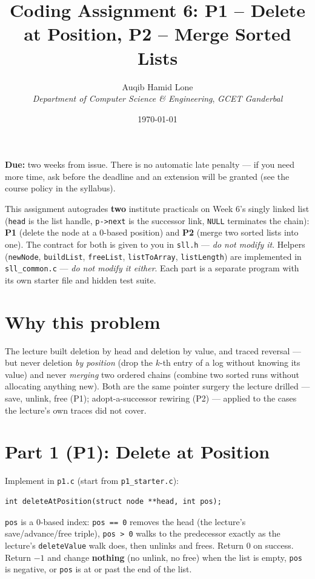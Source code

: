 \documentclass[11pt]{article}
\title{Coding Assignment 6: P1 -- Delete at Position, P2 -- Merge Sorted Lists}
\author{Auqib Hamid Lone\\[0.3em]
  \emph{Department of Computer Science \& Engineering}, \emph{GCET Ganderbal}}
\date{\today}
\begin{document}
\maketitle

\noindent\textbf{Due:} two weeks from issue. There is no automatic late penalty --- if you need more time, ask before the deadline and an extension will be granted (see the course policy in the syllabus).

\noindent This assignment autogrades \textbf{two} institute practicals on Week 6's singly linked list (\texttt{head} is the list handle, \texttt{p->next} is the successor link, \texttt{NULL} terminates the chain): \textbf{P1} (delete the node at a 0-based position) and \textbf{P2} (merge two sorted lists into one). The contract for both is given to you in \texttt{sll.h} --- \emph{do not modify it}. Helpers (\texttt{newNode}, \texttt{buildList}, \texttt{freeList}, \texttt{listToArray}, \texttt{listLength}) are implemented in \texttt{sll\_common.c} --- \emph{do not modify it either}. Each part is a separate program with its own starter file and hidden test suite.

\section{Why this problem}

The lecture built deletion by head and deletion by value, and traced reversal --- but never deletion \emph{by position} (drop the $k$-th entry of a log without knowing its value) and never \emph{merging} two ordered chains (combine two sorted runs without allocating anything new). Both are the same pointer surgery the lecture drilled --- save, unlink, free (P1); adopt-a-successor rewiring (P2) --- applied to the cases the lecture's own traces did not cover.

\section{Part 1 (P1): Delete at Position}

Implement in \texttt{p1.c} (start from \texttt{p1\_starter.c}):

\begin{verbatim}
int deleteAtPosition(struct node **head, int pos);
\end{verbatim}

\texttt{pos} is a 0-based index: \texttt{pos == 0} removes the head (the lecture's save/advance/free triple), \texttt{pos > 0} walks to the predecessor exactly as the lecture's \texttt{deleteValue} walk does, then unlinks and frees. Return $0$ on success. Return $-1$ and change \textbf{nothing} (no unlink, no free) when the list is empty, \texttt{pos} is negative, or \texttt{pos} is at or past the end of the list.
\end{document}
